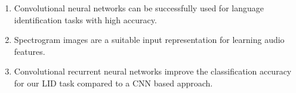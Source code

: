 \begin{enumerate}
	\item Convolutional neural networks can be successfully used for language identification tasks with high accuracy.
	\item Spectrogram images are a suitable input representation for learning audio features.
	\item Convolutional recurrent neural networks improve the classification accuracy for our LID task compared to a CNN based approach.
\end{enumerate}



